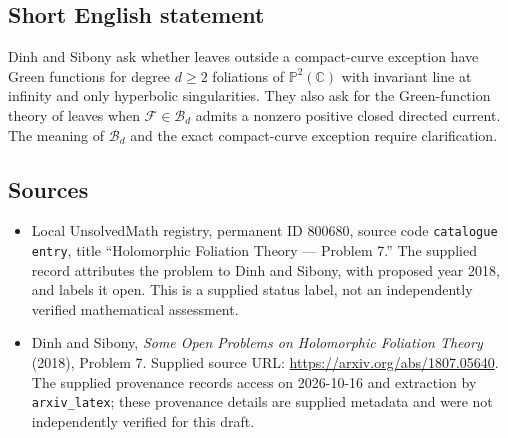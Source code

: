 \documentclass[11pt]{article}
\newcommand{\C}{\mathbb{C}}
\newcommand{\PP}{\mathbb{P}}
\begin{document}
\subsection{Short English statement}
Dinh and Sibony ask whether leaves outside a compact-curve exception have Green functions for degree \(d\geq2\) foliations of \(\PP^2(\C)\) with invariant line at infinity and only hyperbolic singularities. They also ask for the Green-function theory of leaves when \(\mathscr F\in\mathscr B_d\) admits a nonzero positive closed directed current. The meaning of \(\mathscr B_d\) and the exact compact-curve exception require clarification.
\subsection{Sources}
\begin{itemize}
\item Local UnsolvedMath registry, permanent ID \(800680\), source code \texttt{catalogue entry}, title ``Holomorphic Foliation Theory --- Problem 7.'' The supplied record attributes the problem to Dinh and Sibony, with proposed year 2018, and labels it open. This is a supplied status label, not an independently verified mathematical assessment.
\item Dinh and Sibony, \emph{Some Open Problems on Holomorphic Foliation Theory} (2018), Problem 7. Supplied source URL: \url{https://arxiv.org/abs/1807.05640}. The supplied provenance records access on 2026-10-16 and extraction by \texttt{arxiv\_latex}; these provenance details are supplied metadata and were not independently verified for this draft.
\end{itemize}
\end{document}
